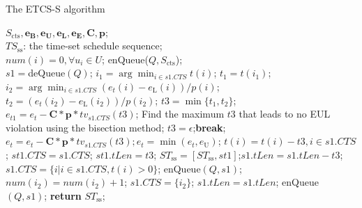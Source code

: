 \documentclass[journal,10pt]{IEEEtran}
\begin{document}
\begin{algorithm}[!htb]
\caption{The ETCS-S algorithm}
\begin{algorithmic}[1]\label{Alg_ETCS_S}
    \REQUIRE $S_\text{cts},\mathbf{e_B}, \mathbf{e_U}, \mathbf{e_L}, \mathbf{e_E}, \mathbf{C}, \mathbf{p}$;\\
    \ENSURE $TS_\text{ss}$: the time-set schedule sequence;\\
    \STATE $num(i)=0, {\forall}u_i{\in}U$; enQueue($Q,S_\text{cts}$); \\
        \STATE $s1{=}$deQueue$(Q)$;
        \STATE $i_1{=}\arg \min_{i{\in}s1.CTS}t(i)$; $t_1{=}t(i_1)$; \label{line_timelen_time}
        \STATE $i_2{=}\arg \min_{i{\in}s1.CTS}(e_t(i){-}e_\text{L}(i))/p(i)$; $t_2{=}(e_t(i_2){-}e_\text{L}(i_2))/p(i_2)$; \label{line_timelen_emin}
            \STATE $t3{=}\min\{t_1,t_2\}$;
            \STATE $e_{t1}{=}e_t{-}\mathbf{C}{*}\mathbf{p}{*}tv_{s1.CTS}(t3)$;
                \STATE Find the maximum $t3$ that leads to no EUL violation using the bisection method;\label{line_timelen_emax}
                    \STATE $t3{=}\epsilon$;\textbf{break};\label{slicelen2epsilon}
                \ENDIF
            \ENDWHILE
            \STATE $e_{t}{=}e_t{-}\mathbf{C}{*}\mathbf{p}{*}tv_{s1.CTS}(t3); e_{t}{=}\min{(e_{t},e_\text{U})}$;
            \STATE $t(i){=}t(i){-}t3, i{\in}s1.CTS$;
            \STATE $st1.CTS{=}s1.CTS$; $st1.tLen{=}t3$;
            \STATE $ST_\text{ss}{=}[ST_\text{ss},st1]$;$s1.tLen{=}s1.tLen{-}t3$;
            \STATE $s1.CTS{=}\{i|i{\in}s1.CTS, t(i){>}0\}$;
                \STATE enQueue$(Q,s1)$;
            \ENDIF
        \ELSE
            \STATE $num(i_2){=}num(i_2){+}1$;
                \STATE $s1.CTS{=}\{i_2\}$; $s1.tLen{=}s1.tLen$;
                \STATE enQueue$(Q,s1)$;
            \ENDIF
        \ENDIF
     \ENDWHILE
     \STATE \textbf{return} $ST_\text{ss}$;
\end{algorithmic}
\end{algorithm}
\end{document}
